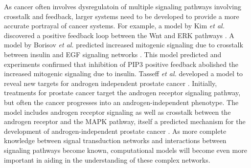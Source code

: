 \documentclass[12pt]{article}
\begin{document}
As cancer often involves dysregulatoin of multiple signaling pathways involving crosstalk and feedback, larger systems need to be developed to provide a more accurate portrayal of cancer systems. For example, a model by Kim \textit{et al.} discovered a positive feedback loop between the Wnt and ERK pathways \cite{Kim2007}. A model by Borisov \textit{et al.} predicted increased mitogenic signaling due to crosstalk between insulin and EGF signaling networks \cite{Borisov2009}. This model predicted and experiments confirmed that inhibition of PIP3 positive feedback abolished the increased mitogenic signaling due to insulin. Tasseff \textit{et al.} developed a model to reveal new targets for androgen independent prostate cancer \cite{Tasseff2010}. Initially, treatments for prostate cancer target the androgen receptor signaling pathway, but often the cancer progresses into an androgen-independent phenotype. The model includes androgen receptor signaling as well as crosstalk between the androgen receptor and the MAPK pathway, itself a predicted mechanism for the development of androgen-independent prostate cancer \cite{Feldman2001}. As more complete knowledge between signal transduction networks and interactions between signaling pathways become known, computational models will become even more important in aiding in the understanding of these complex networks.
\end{document}
